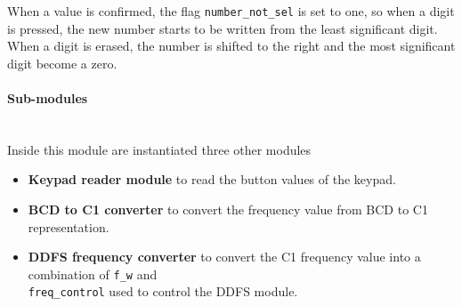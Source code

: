 \noindent
When a value is confirmed, the flag \texttt{number\_not\_sel} is set to one, so when a digit is pressed, the new number starts to be written from the least significant digit. \\
When a digit is erased, the number is shifted to the right and the most significant digit become a zero.

\newpage

\paragraph{Sub-modules} \quad \\
Inside this module are instantiated three other modules

\begin{itemize}
    \item \textbf{Keypad reader module} to read the button values of the keypad.
    \item \textbf{BCD to C1 converter} to convert the frequency value from BCD to C1 representation.
    \item \textbf{DDFS frequency converter} to convert the C1 frequency value into a combination of \texttt{f\_w} and \\
    \texttt{freq\_control} used to control the DDFS module.
\end{itemize}

